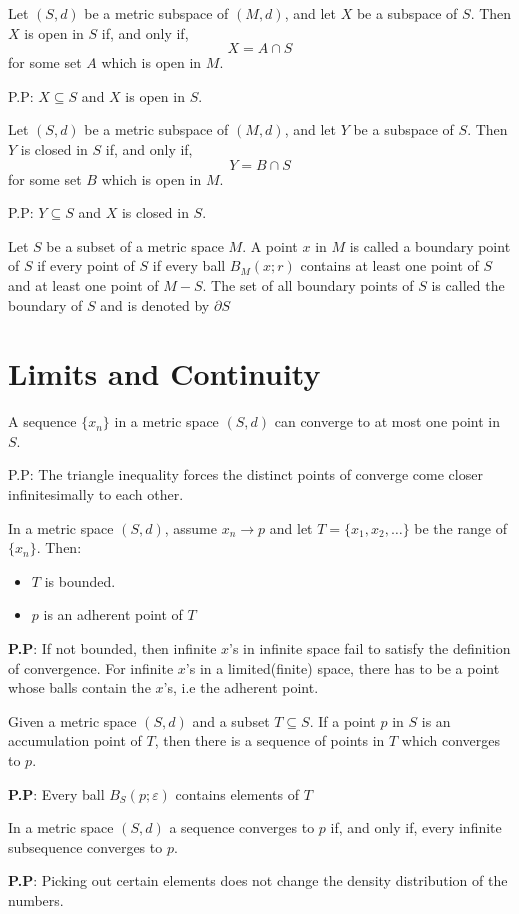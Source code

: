 \documentclass[10pt,a4paper]{book}
\begin{document}
\begin{Thm}
	Let $(S,d)$ be a metric subspace of $(M,d)$, and let $X$ be a subspace of $S$. Then $X$ is open in $S$ if, and only if, 
		$$X = A \cap S$$
		for some set $A$ which is open in $M$.
		
\end{Thm}
\noindent P.P: $X \subseteq S$ and $X$ is open in $S$. 
\begin{Thm}
	Let $(S,d)$ be a metric subspace of $(M,d)$, and let $Y$ be a subspace of $S$. Then $Y$ is closed in $S$ if, and only if, 
	$$Y = B \cap S$$
	for some set $B$ which is open in $M$.
	
\end{Thm}
\noindent P.P: $Y \subseteq S$ and $X$ is closed in $S$. 
\begin{deff}
	Let $S$ be a subset of a metric space $M$. A point $x$ in $M$ is called a boundary point of $S$ if every point of $S$ if every ball $B_M(x;r)$ contains at least one point of $S$ and at least one point of $M -S$. The set of all boundary points of $S$ is called the boundary of $S$ and is denoted by $\partial S$ 
\end{deff}
\chapter{Limits and Continuity}
\begin{Thm}
	A sequence $\{x_n\}$ in a metric space $(S,d)$ can converge to at most one point in $S$.
\end{Thm}
\noindent P.P: The triangle inequality forces the distinct points of converge come closer infinitesimally to each other.
\begin{Thm}
	In a metric space $(S,d)$, assume $x_n \rightarrow p$ and let $T = \{x_1, x_2, \dots \}$ be the range of $\{x_n\}$. Then:
	\begin{itemize}
		\item $T$ is bounded.
		\item $p$ is an adherent point of $T$
	\end{itemize} 

\end{Thm}
\noindent \textbf{P.P}: If not bounded, then infinite $x$'s in infinite space fail to satisfy the definition of convergence. For infinite $x$'s in a limited(finite) space, there has to be a point whose balls contain the $x$'s, i.e the adherent point.

\begin{Thm}
Given a metric space $(S, d)$ and a subset $T \subseteq S$. If a point $p$ in $S$ is an accumulation point of $T$, then there is a sequence of points in $T$ which converges to $p$.
\end{Thm}
\textbf{P.P}: Every ball $B_S(p;\varepsilon)$ contains elements of $T$
\begin{Thm}
In a metric space $(S, d)$ a sequence converges to $p$ if, and only if, every infinite subsequence converges to $p$.
\end{Thm}
\noindent \textbf{P.P}: Picking out certain elements does not change the density distribution of the numbers.
\end{document}
